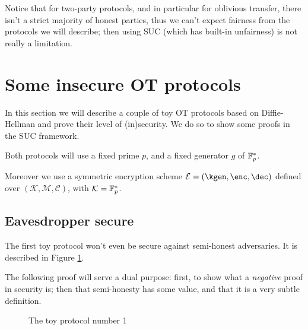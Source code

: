 Notice that for two-party protocols, and in particular for oblivious transfer, there isn't a strict majority of honest parties, thus we can't expect fairness from the protocols we will describe; then using SUC (which has built-in unfairness) is not really a limitation.

\section{Some insecure OT protocols}\label{section_dummy}
In this section we will describe a couple of toy OT protocols based on Diffie-Hellman and prove their level of (in)security. We do so to show some proofs in the SUC framework.

Both protocols will use a fixed prime $p$, and a fixed generator $g$ of $\mathbb{F}_p^\ast$.

Moreover we use a symmetric encryption scheme $\mathcal{E}=(\kgen, \enc, \dec)$ defined over $(\mathcal{K, M, C})$, with $\mathcal{K}=\mathbb{F}_p^\ast$.

\subsection{Eavesdropper secure}
The first toy protocol won't even be secure against semi-honest adversaries. It is described in Figure \ref{prot_dummy_1}.

The following proof will serve a dual purpose: first, to show what a \emph{negative} proof in security is; then that semi-honesty has some value, and that it is a very subtle definition.

\begin{figure}
    \caption{The toy protocol number 1}
    \label{prot_dummy_1}
\end{figure}

